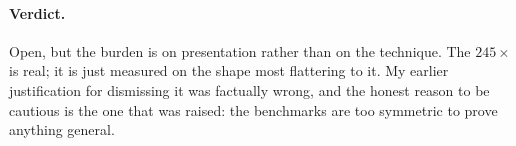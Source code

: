\paragraph{Verdict.} Open, but the burden is on presentation rather than on the technique. The
$245\times$ is real; it is just measured on the shape most flattering to it. My earlier
justification for dismissing it was factually wrong, and the honest reason to be cautious is the
one that was raised: the benchmarks are too symmetric to prove anything general.
